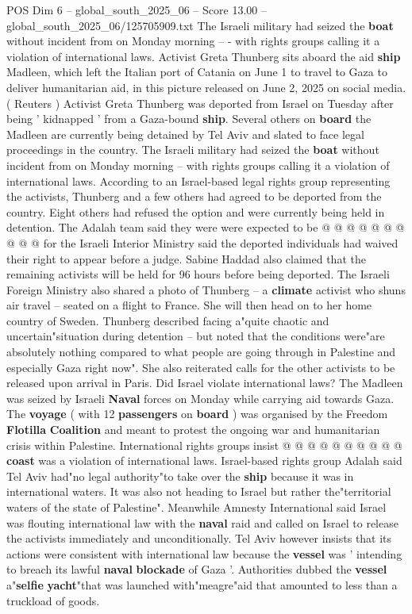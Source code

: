 \begin{textsample}{POS Dim 6 – global\_south\_2025\_06 – Score 13.00 – global\_south\_2025\_06/125705909.txt}  \label{ex:f6_pos_020}
The Israeli military had seized the \textbf{boat} without incident from on Monday morning -- - with rights groups calling it a violation of international laws.
Activist Greta Thunberg sits aboard the aid \textbf{ship} Madleen, which left the Italian port of Catania on June 1 to travel to Gaza to deliver humanitarian aid, in this picture released on June 2, 2025 on social media. ( Reuters ) Activist Greta Thunberg was deported from Israel on Tuesday after being ' kidnapped ' from a Gaza-bound \textbf{ship}.
Several others on \textbf{board} the Madleen are currently being detained by Tel Aviv and slated to face legal proceedings in the country.
The Israeli military had seized the \textbf{boat} without incident from on Monday morning -- with rights groups calling it a violation of international laws.
According to an Israel-based legal rights group representing the activists, Thunberg and a few others had agreed to be deported from the country.
Eight others had refused the option and were currently being held in detention.
The Adalah team said they were were expected to be @ @ @ @ @ @ @ @ @ @ for the Israeli Interior Ministry said the deported individuals had waived their right to appear before a judge.
Sabine Haddad also claimed that the remaining activists will be held for 96 hours before being deported.
The Israeli Foreign Ministry also shared a photo of Thunberg -- a \textbf{climate} activist who shuns air travel -- seated on a flight to France.
She will then head on to her home country of Sweden.
Thunberg described facing a"quite chaotic and uncertain"situation during detention -- but noted that the conditions were"are absolutely nothing compared to what people are going through in Palestine and especially Gaza right now".
She also reiterated calls for the other activists to be released upon arrival in Paris.
Did Israel violate international laws?
The Madleen was seized by Israeli \textbf{Naval} forces on Monday while carrying aid towards Gaza.
The \textbf{voyage} ( with 12 \textbf{passengers} on \textbf{board} ) was organised by the Freedom \textbf{Flotilla} \textbf{Coalition} and meant to protest the ongoing war and humanitarian crisis within Palestine.
International rights groups insist @ @ @ @ @ @ @ @ @ @ \textbf{coast} was a violation of international laws.
Israel-based rights group Adalah said Tel Aviv had"no legal authority"to take over the \textbf{ship} because it was in international waters.
It was also not heading to Israel but rather the"territorial waters of the state of Palestine".
Meanwhile Amnesty International said Israel was flouting international law with the \textbf{naval} raid and called on Israel to release the activists immediately and unconditionally.
Tel Aviv however insists that its actions were consistent with international law because the \textbf{vessel} was ' intending to breach its lawful \textbf{naval} \textbf{blockade} of Gaza '.
Authorities dubbed the \textbf{vessel} a"\textbf{selfie} \textbf{yacht}"that was launched with"meagre"aid that amounted to less than a truckload of goods.

\end{textsample}
